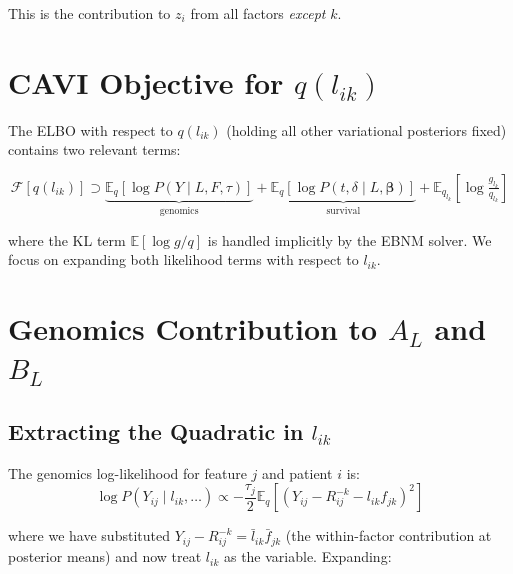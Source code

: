 \documentclass[11pt]{article}
\newcommand{\lbar}[2]{\bar{l}_{#1#2}}
\newcommand{\fbar}[2]{\bar{f}_{#1#2}}
\newcommand{\Rk}[0]{R^{-k}}
\begin{document}
This is the contribution to $z_i$ from all factors \emph{except} $k$.

\section{CAVI Objective for $q(l_{ik})$}\label{sec:objective}

The ELBO with respect to $q(l_{ik})$ (holding all other variational
posteriors fixed) contains two relevant terms:

\begin{equation}
  \mathcal{F}[q(l_{ik})] \supset
  \underbrace{\mathbb{E}_q\!\left[\log P(Y \mid L,F,\tau)\right]}_{\text{genomics}}
  +
  \underbrace{\mathbb{E}_q\!\left[\log P(t,\delta \mid L,\bm{\beta})\right]}_{\text{survival}}
  +
  \mathbb{E}_{q_{l_k}}\!\left[\log\tfrac{g_{l_k}}{q_{l_k}}\right]
  \label{eq:elbo-lik}
\end{equation}

where the KL term $\mathbb{E}[\log g/q]$ is handled implicitly by the EBNM
solver.  We focus on expanding both likelihood terms with respect to
$l_{ik}$.

\section{Genomics Contribution to $A_L$ and $B_L$}\label{sec:genomics}

\subsection{Extracting the Quadratic in $l_{ik}$}

The genomics log-likelihood for feature $j$ and patient $i$ is:
\begin{equation}
  \log P(Y_{ij} \mid l_{ik}, \ldots)
  \propto -\frac{\tau_j}{2}\mathbb{E}_q\!\left[(Y_{ij} - \Rk_{ij} - l_{ik}f_{jk})^2\right]
  \label{eq:genomics-lk}
\end{equation}

where we have substituted $Y_{ij} - \Rk_{ij} = \lbar{i}{k}\fbar{j}{k}$
(the within-factor contribution at posterior means) and now treat $l_{ik}$
as the variable.  Expanding:
\end{document}
